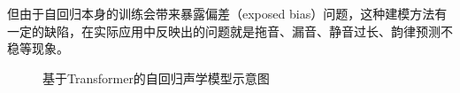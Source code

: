 但由于自回归本身的训练会带来暴露偏差（exposed bias）问题，这种建模方法有一定的缺陷，在实际应用中反映出的问题就是拖音、漏音、静音过长、韵律预测不稳等现象。
\begin{figure}[ht]
  \caption{基于Transformer的自回归声学模型示意图}
\end{figure}
